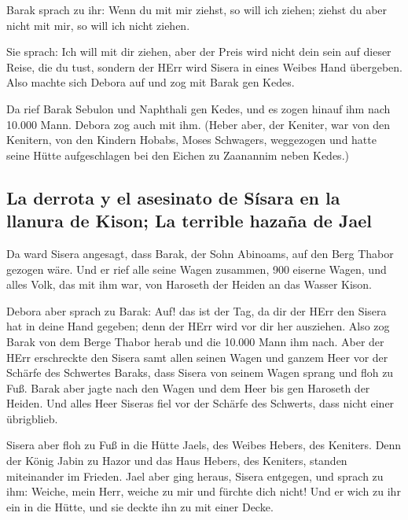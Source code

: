  Barak sprach zu ihr: Wenn du mit mir ziehst, so will ich
ziehen; ziehst du aber nicht mit mir, so will ich nicht ziehen.

 Sie sprach: Ich will mit dir ziehen, aber der Preis wird
nicht dein sein auf dieser Reise, die du tust, sondern der HErr wird
Sisera in eines Weibes Hand übergeben. Also machte sich Debora auf und
zog mit Barak gen Kedes.

 Da rief Barak Sebulon und Naphthali gen Kedes, und es
zogen hinauf ihm nach 10.000 Mann. Debora zog auch mit ihm.
 (Heber aber, der Keniter, war von den Kenitern, von den
Kindern Hobabs, Moses Schwagers, weggezogen und hatte seine Hütte
aufgeschlagen bei den Eichen zu Zaanannim neben Kedes.)

\hypertarget{la-derrota-y-el-asesinato-de-suxedsara-en-la-llanura-de-kison-la-terrible-hazauxf1a-de-jael}{%
\subsection{La derrota y el asesinato de Sísara en la llanura de Kison;
La terrible hazaña de
Jael}\label{la-derrota-y-el-asesinato-de-suxedsara-en-la-llanura-de-kison-la-terrible-hazauxf1a-de-jael}}

 Da ward Sisera angesagt, dass Barak, der Sohn Abinoams,
auf den Berg Thabor gezogen wäre.  Und er rief alle seine
Wagen zusammen, 900 eiserne Wagen, und alles Volk, das mit ihm war, von
Haroseth der Heiden an das Wasser Kison.

 Debora aber sprach zu Barak: Auf! das ist der Tag, da
dir der HErr den Sisera hat in deine Hand gegeben; denn der HErr wird
vor dir her ausziehen. Also zog Barak von dem Berge Thabor herab und die
10.000 Mann ihm nach.  Aber der HErr erschreckte den
Sisera samt allen seinen Wagen und ganzem Heer vor der Schärfe des
Schwertes Baraks, dass Sisera von seinem Wagen sprang und floh zu Fuß.
 Barak aber jagte nach den Wagen und dem Heer bis gen
Haroseth der Heiden. Und alles Heer Siseras fiel vor der Schärfe des
Schwerts, dass nicht einer übrigblieb.

 Sisera aber floh zu Fuß in die Hütte Jaels, des Weibes
Hebers, des Keniters. Denn der König Jabin zu Hazor und das Haus Hebers,
des Keniters, standen miteinander im Frieden.  Jael aber
ging heraus, Sisera entgegen, und sprach zu ihm: Weiche, mein Herr,
weiche zu mir und fürchte dich nicht! Und er wich zu ihr ein in die
Hütte, und sie deckte ihn zu mit einer Decke.

